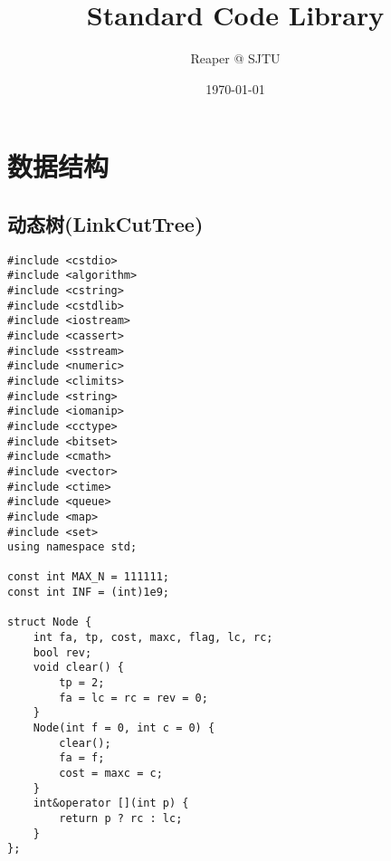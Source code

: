 \documentclass{article}
\begin{document}
\title{Standard Code Library}
\author{Reaper @ SJTU}
\date{\today}

\maketitle

\tableofcontents


\section{数据结构}

\subsection{动态树(LinkCutTree)}

\begin{lstlisting}
#include <cstdio>
#include <algorithm>
#include <cstring>
#include <cstdlib>
#include <iostream>
#include <cassert>
#include <sstream>
#include <numeric>
#include <climits>
#include <string>
#include <iomanip>
#include <cctype>
#include <bitset>
#include <cmath>
#include <vector>
#include <ctime>
#include <queue>
#include <map>
#include <set>
using namespace std;

const int MAX_N = 111111;
const int INF = (int)1e9;

struct Node {
    int fa, tp, cost, maxc, flag, lc, rc;
    bool rev;
    void clear() {
        tp = 2;
        fa = lc = rc = rev = 0;
    }
    Node(int f = 0, int c = 0) {
        clear();
        fa = f;
        cost = maxc = c;
    }
    int&operator [](int p) {
        return p ? rc : lc;
    }
};


\end{lstlisting}
\end{document}
